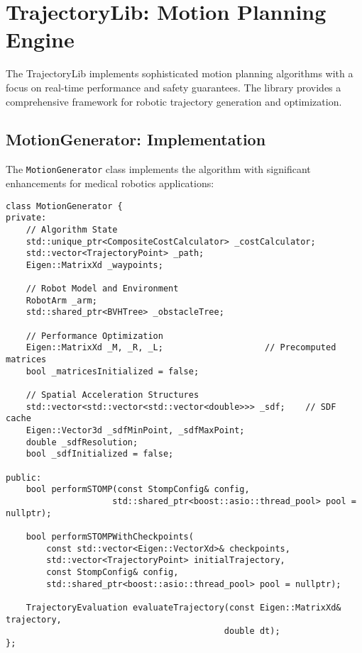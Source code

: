\section{TrajectoryLib: Motion Planning Engine}
\label{sec:trajectorylib_analysis}

The TrajectoryLib implements sophisticated motion planning algorithms with a focus on real-time performance and safety guarantees. The library provides a comprehensive framework for robotic trajectory generation and optimization.

\subsection{MotionGenerator: \stomp{} Implementation}

The \texttt{MotionGenerator} class implements the \stomp{} algorithm with significant enhancements for medical robotics applications:

\begin{lstlisting}[caption={MotionGenerator Core Algorithm}, label={lst:motion_generator_core}]
class MotionGenerator {
private:
    // Algorithm State
    std::unique_ptr<CompositeCostCalculator> _costCalculator;
    std::vector<TrajectoryPoint> _path;
    Eigen::MatrixXd _waypoints;
    
    // Robot Model and Environment
    RobotArm _arm;
    std::shared_ptr<BVHTree> _obstacleTree;
    
    // Performance Optimization
    Eigen::MatrixXd _M, _R, _L;                    // Precomputed matrices
    bool _matricesInitialized = false;
    
    // Spatial Acceleration Structures
    std::vector<std::vector<std::vector<double>>> _sdf;    // SDF cache
    Eigen::Vector3d _sdfMinPoint, _sdfMaxPoint;
    double _sdfResolution;
    bool _sdfInitialized = false;
    
public:
    bool performSTOMP(const StompConfig& config,
                     std::shared_ptr<boost::asio::thread_pool> pool = nullptr);
    
    bool performSTOMPWithCheckpoints(
        const std::vector<Eigen::VectorXd>& checkpoints,
        std::vector<TrajectoryPoint> initialTrajectory,
        const StompConfig& config,
        std::shared_ptr<boost::asio::thread_pool> pool = nullptr);
    
    TrajectoryEvaluation evaluateTrajectory(const Eigen::MatrixXd& trajectory, 
                                           double dt);
};
\end{lstlisting}

